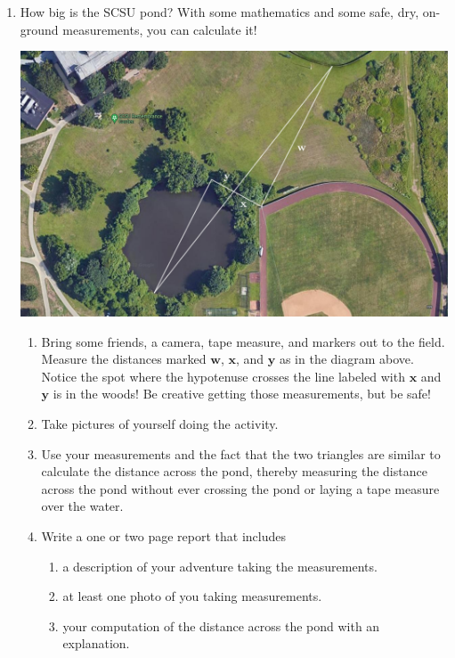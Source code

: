 \begin{enumerate}

\item How big is the SCSU pond? With some mathematics and some safe, dry, on-ground measurements, you can calculate it! 
\begin{center}
    \includegraphics[width=5.5in]{images/SCSU Pond}
\end{center}
\begin{enumerate}
\item Bring some friends, a camera, tape measure, and markers out to the field. Measure the distances marked $\mathbf w$, $\mathbf x$, and $\mathbf y$ as in the diagram above. Notice the spot where the hypotenuse crosses the line labeled with $\mathbf x$ and $\mathbf y$ is in the woods! Be creative getting those measurements, but be safe!
\item Take pictures of yourself doing the activity.
\item Use your measurements and the fact that the two triangles are similar to calculate the distance across the pond, thereby measuring the distance across the pond without ever crossing the pond or laying a tape measure over the water.
\item Write a one or two page report that includes
\begin{enumerate}
    \item a description of your adventure taking the measurements.
    \item at least one photo of you taking measurements.
    \item your computation of the distance across the pond with an explanation.
\end{enumerate}

\end{enumerate}


\end{enumerate}

